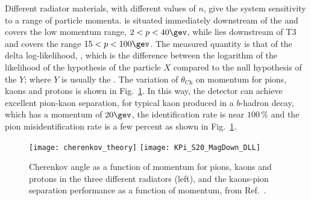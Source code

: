 Different radiator materials, with different values of $n$, give the \rich system sensitivity to a
range of particle momenta.
\richone is situated immediately downstream of the \velo and covers the low momentum range,
$2<p<40\gev$, while \richtwo lies downstream of T3 and covers the range $15<p<100\gev$.
The measured quantity is that of the delta log-likelihood, \dllxy, which is the difference between the
logarithm of the likelihood of the hypothesis of the particle $X$ compared to the null hypothesis of the
$Y$; where $Y$ is usually the \pion.
The variation of $\theta_\mathrm{Ch}$ on momentum for pions, kaons and protons is shown in
Fig.~\ref{fig:lhcb:pideff}.
In this way, the \lhcb detector can achieve excellent pion-kaon separation, for typical kaon
produced in a $b$-hadron decay, which has a
momentum of \approx$20\gev$, the identification rate is near $100\,\%$ and the pion misidentification
rate is a few percent as shown in Fig.~\ref{fig:lhcb:pideff}.

\begin{figure}
  \begin{center}
    \texttt{[image: cherenkov\_theory]}
    \texttt{[image: KPi\_S20\_MagDown\_DLL]}
  \end{center}
  \caption[Particle identification and Cherenkov angles]
  {\small
    Cherenkov angle as a function of momentum for pions, kaons and protons in the three different
    radiators (left), and the kaons-pion separation performance as a function of momentum, from
    Ref.~\cite{LHCb-DP-2012-003}.
  }
  \label{fig:lhcb:pideff}
\end{figure}





